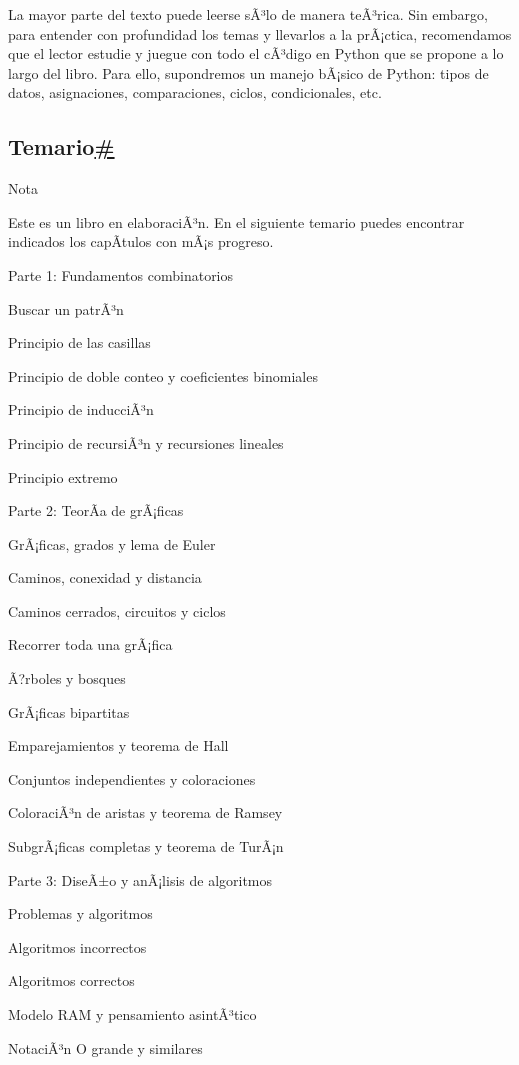 \documentclass[
]{article}
\begin{document}
La mayor parte del texto puede leerse sÃ³lo de manera teÃ³rica. Sin
embargo, para entender con profundidad los temas y llevarlos a la
prÃ¡ctica, recomendamos que el lector estudie y juegue con todo el
cÃ³digo en Python que se propone a lo largo del libro. Para ello,
supondremos un manejo bÃ¡sico de Python: tipos de datos, asignaciones,
comparaciones, ciclos, condicionales, etc.

\subsection{\texorpdfstring{Temario\hyperref[temario]{\#}}{Temario\#}}\label{temario}

Nota

Este es un libro en elaboraciÃ³n. En el siguiente temario puedes
encontrar indicados los capÃ­tulos con mÃ¡s progreso.

Parte 1: Fundamentos combinatorios

Buscar un patrÃ³n

Principio de las casillas

Principio de doble conteo y coeficientes binomiales

Principio de inducciÃ³n

Principio de recursiÃ³n y recursiones lineales

Principio extremo

Parte 2: TeorÃ­a de grÃ¡ficas

GrÃ¡ficas, grados y lema de Euler

Caminos, conexidad y distancia

Caminos cerrados, circuitos y ciclos

Recorrer toda una grÃ¡fica

Ã?rboles y bosques

GrÃ¡ficas bipartitas

Emparejamientos y teorema de Hall

Conjuntos independientes y coloraciones

ColoraciÃ³n de aristas y teorema de Ramsey

SubgrÃ¡ficas completas y teorema de TurÃ¡n

Parte 3: DiseÃ±o y anÃ¡lisis de algoritmos

Problemas y algoritmos

Algoritmos incorrectos

Algoritmos correctos

Modelo RAM y pensamiento asintÃ³tico

NotaciÃ³n O grande y similares
\end{document}
